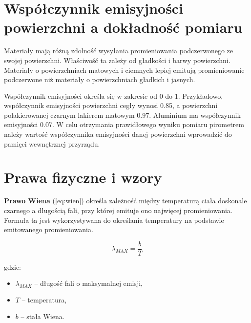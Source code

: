\section*{Współczynnik emisyjności powierzchni a dokładność pomiaru}

Materiały mają różną zdolność wysyłania promieniowania podczerwonego ze swojej powierzchni. Właściwość ta zależy od gładkości i barwy powierzchni. Materiały o powierzchniach matowych i ciemnych lepiej emitują promieniowanie podczerwone niż materiały o powierzchniach gładkich i jasnych.

\vspace{12pt}

Współczynnik emisyjności określa się w zakresie od 0 do 1. Przykładowo, współczynnik emisyjności powierzchni cegły wynosi 0.85, a powierzchni polakierowanej czarnym lakierem matowym 0.97. Aluminium ma współczynnik emisyjności 0.07. W celu otrzymania prawidłowego wyniku pomiaru pirometrem należy wartość współczynnika emisyjności danej powierzchni wprowadzić do pamięci wewnętrznej przyrządu.






\section*{Prawa fizyczne i wzory}

\textbf{Prawo Wiena} (\ref{eq:wien}) określa zależność między temperaturą ciała doskonale czarnego a długością fali, przy której emituje ono najwięcej promieniowania. Formuła ta jest wykorzystywana do określania temperatury na podstawie emitowanego promieniowania.

\begin{equation}
    \lambda_{MAX} = \frac{b}{T}
    \label{eq:wien}
\end{equation}

gdzie:
\begin{itemize}
    \item $\lambda_{MAX}$ – długość fali o maksymalnej emisji,
    \item $T$ – temperatura,
    \item $b$ – stała Wiena.
\end{itemize}

